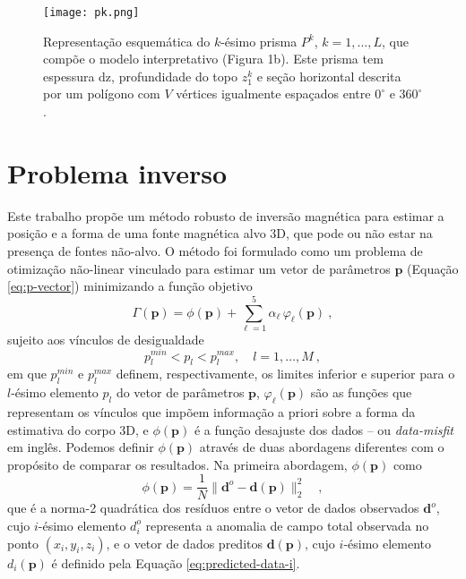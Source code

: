 \begin{figure}[!htb]
	\centering
	\texttt{[image: pk.png]}
	\caption{Representação esquemática do $k$-ésimo prisma $P^k$, $k=1,\dots, L$, que compõe o modelo interpretativo (Figura 1b). Este prisma tem espessura dz, profundidade do topo $z_1^k$ e seção horizontal descrita por um polígono com $V$ vértices igualmente espaçados entre $0^{\circ}$ e $360^{\circ}$.
}
	\label{fig:pk}
\end{figure}
\pagebreak

\section{Problema inverso}

Este trabalho propõe um método robusto de inversão magnética para estimar a posição e a forma de uma fonte magnética alvo 3D, que pode ou não estar na presença de fontes não-alvo.
O método foi formulado como um problema de otimização não-linear vinculado para estimar um vetor de parâmetros $\mathbf{p}$ (Equação \ref{eq:p-vector}) minimizando a função objetivo
\begin{equation}
\Gamma (\mathbf{p}) = \phi (\mathbf{p}) + \sum\limits^{5}_{\ell =1} \alpha_{\ell} \, \varphi_{\ell}(\mathbf{p}) \: ,
\label{eq:gamma}
\end{equation}
sujeito aos vínculos de desigualdade
\begin{equation}
p_{l}^{min} < p_{l} < p_{l}^{max}, \quad l = 1, \dots, M \: ,
\label{eq:inequality-constraints}
\end{equation}
em que $p_{l}^{min}$ e $p_{l}^{max}$ definem, respectivamente, os limites inferior e superior para o $l$-ésimo elemento $p_{l}$ do vetor de parâmetros $\mathbf{p}$,
$\varphi_{\ell}(\mathbf{p})$ são as funções que representam os vínculos que impõem informação a priori sobre a forma da estimativa do corpo 3D, e $\phi (\mathbf{p})$ 
é a função desajuste dos dados -- ou \textit{data-misfit} em inglês.
Podemos definir $\phi (\mathbf{p})$ através de duas abordagens diferentes com o propósito de comparar os resultados. Na primeira abordagem, $\phi (\mathbf{p})$ como
\begin{equation}\label{eq:L2_misfit}
\phi (\mathbf{p}) = \frac{1}{N} 
\| \mathbf{d}^{o} - \mathbf{d}(\mathbf{p}) \|_{2}^{2} \quad ,
\end{equation}
que é a norma-2 quadrática \citep[por exemplo,][p. 331]{aster_etal2019} dos resíduos entre o vetor de dados observados $\mathbf{d}^{o}$, cujo $i$-ésimo elemento $d_{i}^{o}$ representa a anomalia de campo total observada no ponto $(x_{i}, y_{i}, z_{i})$, e o vetor de dados preditos $\mathbf{d}(\mathbf{p})$, cujo $i$-ésimo elemento $d_{i} (\mathbf{p})$ é definido pela Equação \ref{eq:predicted-data-i}.
